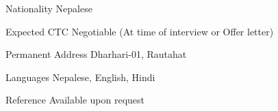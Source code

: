 

\begin{cvskills}	
	\cvskill
	{Nationality} %
	{Nepalese} %
	
	\cvskill
	{Expected CTC} %
	{Negotiable (At time of interview or Offer letter)} %
	
	\cvskill
	{Permanent Address} %
	{Dharhari-01, Rautahat} %
	
	\cvskill
	{Languages} %
	{Nepalese, English, Hindi} %
	
	
	\cvskill
	{Reference} %
	{Available upon request} %
		
\end{cvskills}


